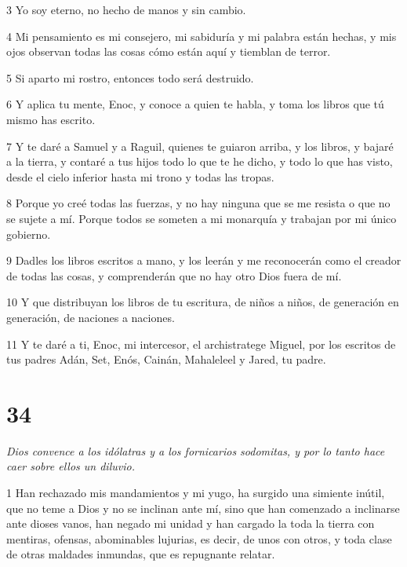 \par 3 Yo soy eterno, no hecho de manos y sin cambio.

\par 4 Mi pensamiento es mi consejero, mi sabiduría y mi palabra están hechas, y mis ojos observan todas las cosas cómo están aquí y tiemblan de terror.

\par 5 Si aparto mi rostro, entonces todo será destruido.

\par 6 Y aplica tu mente, Enoc, y conoce a quien te habla, y toma los libros que tú mismo has escrito.

\par 7 Y te daré a Samuel y a Raguil, quienes te guiaron arriba, y los libros, y bajaré a la tierra, y contaré a tus hijos todo lo que te he dicho, y todo lo que has visto, desde el cielo inferior hasta mi trono y todas las tropas.

\par 8 Porque yo creé todas las fuerzas, y no hay ninguna que se me resista o que no se sujete a mí. Porque todos se someten a mi monarquía y trabajan por mi único gobierno.

\par 9 Dadles los libros escritos a mano, y los leerán y me reconocerán como el creador de todas las cosas, y comprenderán que no hay otro Dios fuera de mí.

\par 10 Y que distribuyan los libros de tu escritura, de niños a niños, de generación en generación, de naciones a naciones.

\par 11 Y te daré a ti, Enoc, mi intercesor, el archistratege Miguel, por los escritos de tus padres Adán, Set, Enós, Cainán, Mahaleleel y Jared, tu padre.

\chapter{34}

\par \textit{Dios convence a los idólatras y a los fornicarios sodomitas, y por lo tanto hace caer sobre ellos un diluvio.}

\par 1 Han rechazado mis mandamientos y mi yugo, ha surgido una simiente inútil, que no teme a Dios y no se inclinan ante mí, sino que han comenzado a inclinarse ante dioses vanos, han negado mi unidad y han cargado la toda la tierra con mentiras, ofensas, abominables lujurias, es decir, de unos con otros, y toda clase de otras maldades inmundas, que es repugnante relatar.

